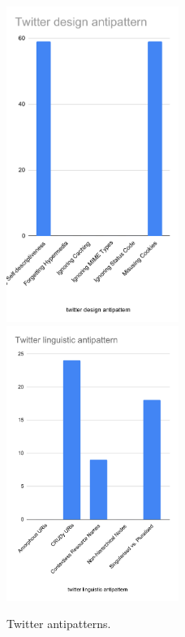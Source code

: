 \begin{figure}[htb!]
\includegraphics[width=0.5\textwidth]{img/exampleBars/twitterDesPatt.pdf}
\includegraphics[width=0.5\textwidth]{img/exampleBars/twitterLingAnti.pdf}
\caption{Twitter antipatterns.}
\label{fig:twitterBarAntiEx}
\end{figure}

